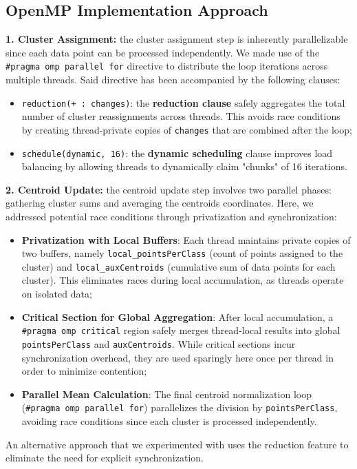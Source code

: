 \documentclass[11pt, journal]{IEEEtran}
\newcommand{\nwl}{

\vspace{11pt}

}
\begin{document}
\subsection{OpenMP Implementation Approach}

\noindent \textbf{1. Cluster Assignment:} the cluster assignment step is inherently parallelizable since each data point can be processed independently. We made use of the \texttt{\#pragma omp parallel for} directive to distribute the loop iterations across multiple threads. Said directive has been accompanied by the following clauses:

\begin{itemize}
    \item \texttt{reduction(+ : changes)}: the \textbf{reduction clause} safely aggregates the total number of cluster reassignments across threads. This avoids race conditions by creating thread-private copies of \texttt{changes} that are combined after the loop;
    \item \texttt{schedule(dynamic, 16)}: the \textbf{dynamic scheduling} clause improves load balancing by allowing threads to dynamically claim "chunks" of 16 iterations.
\end{itemize}
\nwl
\noindent \textbf{2. Centroid Update:} the centroid update step involves two parallel phases: gathering cluster sums and averaging the centroids coordinates. Here, we addressed potential race conditions through privatization and synchronization:
\begin{itemize}
    \item \textbf{Privatization with Local Buffers}: Each thread maintains private copies of two buffers, namely \texttt{local\_pointsPerClass} (count of points assigned to the cluster) and \texttt{local\_auxCentroids} (cumulative sum of data points for each cluster). This eliminates races during local accumulation, as threads operate on isolated data;
    \item \textbf{Critical Section for Global Aggregation}: After local accumulation, a \texttt{\#pragma omp critical} region safely merges thread-local results into global \texttt{pointsPerClass} and \texttt{auxCentroids}. While critical sections incur synchronization overhead, they are used sparingly here once per thread in order to minimize contention;
    \item \textbf{Parallel Mean Calculation}: The final centroid normalization loop (\texttt{\#pragma omp parallel for}) parallelizes the division by \texttt{pointsPerClass}, avoiding race conditions since each cluster is processed independently.
\end{itemize}
\nwl
An alternative approach that we experimented with uses the reduction feature to eliminate the need for explicit synchronization.
\end{document}
